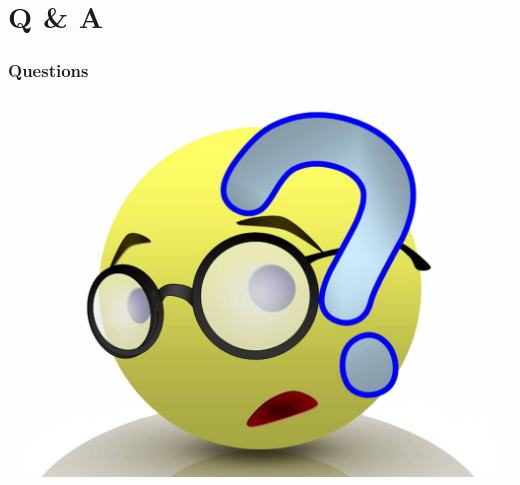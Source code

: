 \documentclass[t]{beamer}
\begin{document}
\section*{Q \& A}
\begin{frame}\frametitle{Questions}
\begin{center}
	\includegraphics[scale=0.3]{QandA.jpg}
\end{center}
\end{frame}
\end{document}
